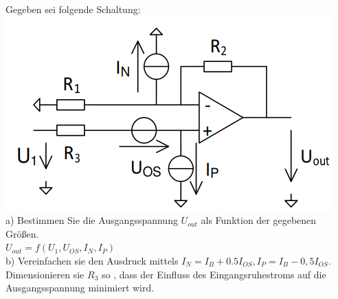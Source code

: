\documentclass[A4]{scrartcl}
\begin{document}
  Gegeben sei folgende Schaltung:\\
  \includegraphics{Schaltung8.png}\\
  a) Bestimmen Sie die Ausgangsspannung $U_{out}$ als Funktion der gegebenen Größen.\\
  $U_{out} = f(U_1,U_{OS},I_N,I_P)$\\
  b) Vereinfachen sie den Ausdruck mittels $I_N = I_B + 0.5 I_{OS}, I_P = I_B-0,5 I_{OS}$.\\
  Dimensionieren sie $R_3$ so , dass der Einfluss des Eingangsruhestroms auf die Ausgangsspannung minimiert wird.\\\\
\end{document}
